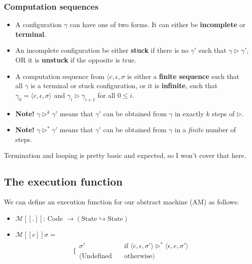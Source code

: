 \documentclass[11pt,a4paper,headsepline,titlepage,dvipsnames,cmyk]{scrartcl}
\newcommand\pfun{\hookrightarrow}
\begin{document}
\subsubsection{Computation sequences}%
\label{ssub:Computation sequences}
\begin{itemize}
    \item A configuration $\gamma$ can have one of two forms. It can either be
        \textbf{incomplete} or \textbf{terminal}.
    \item An incomplete configuration be either \textbf{stuck} if there is
        no $\gamma'$ such that $\gamma
        \triangleright \gamma'$, OR it is \textbf{unstuck} if the opposite is
        true.
    \item A computation sequence from $\langle c, \epsilon, \sigma$ is
        either a \textbf{finite sequence} such that all $\gamma$ is a
        terminal or stuck configuration, or it is \textbf{infinite}, such
        that $\gamma_0 = \langle c, \epsilon, \sigma \rangle$ and
        $\gamma_i \triangleright \gamma_{i+1}$ for all $0 \le i$.
    \item \textbf{Note!} $\gamma \triangleright ^k \gamma'$ means that
        $\gamma'$ can be obtained from $\gamma$ in exactly $k$ steps of
        $\triangleright$.
    \item \textbf{Note!} $\gamma \triangleright ^* \gamma'$ means that
        $\gamma'$ can be obtained from $\gamma$ in a \textit{finite}
        number of steps.
\end{itemize}

Termination and looping is pretty basic and expected, so I won't cover
that here.

\subsection{The execution function}%
\label{sub:exec-func}
We can define an execution function for our abstract machine (AM) as
follows:
\begin{itemize}
    \item $\mathcal{M}[\![.]\!]$: Code $\rightarrow (\text{State} \pfun
        \text{State})$
    \item $\mathcal{M}[\![c]\!] \sigma = $
        \begin{align*}
            \Bigg \{ 
                \begin{split}
                    \sigma' \quad &\text{if } \langle c, \epsilon, \sigma' \rangle
                    \triangleright^* \langle \epsilon, e, \sigma' \rangle \\
                    (\text{Undefined} \quad &\text{otherwise})
                \end{split}
        \end{align*}
\end{itemize}
\end{document}
